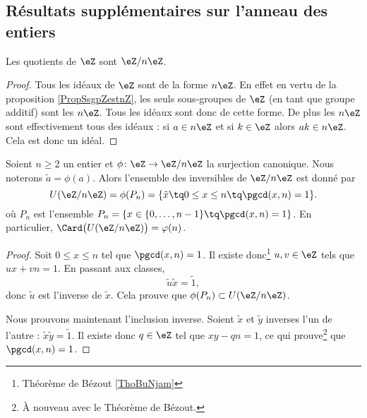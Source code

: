 \subsection{Résultats supplémentaires sur l'anneau des entiers}

\begin{corollary}       \label{CORooLINXooBlUKPG}
    Les quotients de \( \eZ\) sont \( \eZ/n\eZ\).
\end{corollary}

\begin{proof}
    Tous les idéaux de \( \eZ\) sont de la forme \( n\eZ\). En effet en vertu de la proposition \ref{PropSsgpZestnZ}, les seuls sous-groupes de \( \eZ\) (en tant que groupe additif) sont les \( n\eZ\). Tous les idéaux sont donc de cette forme. De plus les \( n\eZ\) sont effectivement tous des idéaux : si \( a\in n\eZ\) et si \( k\in \eZ\) alors \( ak\in n\eZ\). Cela est donc un idéal.
\end{proof}

\begin{proposition}     \label{PropZpintssiprempUzn}
    Soient \( n\geq 2\) un entier et \( \phi\colon \eZ\to \eZ/n\eZ\) la surjection canonique. Nous noterons \( \tilde a=\phi(a)\). Alors l'ensemble des inversibles de \( \eZ/n\eZ\) est donné par
    \begin{equation}
        U(\eZ/n\eZ)=\phi(P_n)=\{ \tilde x\tq 0\leq x\leq n\tq\pgcd(x,n)=1 \}.
    \end{equation}
    où \( P_n\) est l'ensemble $P_n=\{ x\in\{ 0,\ldots,n-1 \}\tq\pgcd(x,n)=1 \}$. En particulier, \( \Card\big( U(\eZ/n\eZ) \big)=\varphi(n)\).
\end{proposition}

\begin{proof}
    Soit \( 0\leq x\leq n\) tel que \( \pgcd(x,n)=1\). Il existe donc\footnote{Théorème de Bézout \ref{ThoBuNjam}} \( u,v\in\eZ\) tels que \( ux+vn=1\). En passant aux classes,
    \begin{equation}
        \tilde u\tilde x=\tilde 1,
    \end{equation}
    donc \( \tilde u\) est l'inverse de \( \tilde x\). Cela prouve que \( \phi(P_n)\subset U(\eZ/n\eZ)\).

    Nous prouvons maintenant l'inclusion inverse. Soient \( \tilde x\) et \( \tilde y\) inverses l'un de l'autre : $\tilde x\tilde y=\tilde 1$. Il existe donc \( q\in\eZ\) tel que \( xy-qn=1\), ce qui prouve\footnote{À nouveau avec le Théorème de Bézout.} que \( \pgcd(x,n)=1\).
\end{proof}

